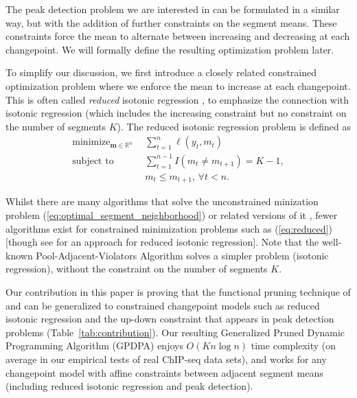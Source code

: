 \documentclass[twoside,11pt]{article}
\DeclareMathOperator*{\minimize}{minimize}
\newcommand{\RR}{\mathbb R}
\begin{document}
The peak detection problem we are interested in can be formulated in a similar way, but with
the addition of further constraints on the segment means. These constraints force the mean
to alternate between increasing and decreasing at each changepoint. We will formally define the resulting
optimization problem later.

To simplify our discussion, we first introduce a closely related
constrained optimization problem where we enforce the mean to increase
at each changepoint. This is often called \emph{reduced} isotonic regression
\citep{reduced-monotonic-regression}, to emphasize the connection with
isotonic regression (which includes the increasing
constraint but no constraint on the number of segments $K$). The
reduced isotonic regression problem is defined as
\begin{align}
  \label{eq:reduced}
  \minimize_{\mathbf m\in\RR^n} &\ \ 
  \sum_{t=1}^n \ell(y_t, m_t)\\
  \text{subject to} &\ \  \sum_{t=1}^{n-1} I(m_t \neq m_{t+1}) = K-1,
  \nonumber\\
  &\ \  m_t \leq m_{t+1},\, \forall t<n.
  \nonumber 
\end{align}

Whilst there are many algorithms that solve the unconstrained
minization problem (\ref{eq:optimal_segment_neighborhood})
\citep{segment-neighborhood,pruned-dp,phd-johnson} or related versions
of it \citep{optimal-partitioning,pelt,fpop,flsa}, fewer algorithms
exist for constrained minimization problems such as (\ref{eq:reduced})
[though see \citet{hardwick2014optimal} for an approach for reduced
isotonic regression]. Note that the well-known Pool-Adjacent-Violators
Algorithm \citep{mair2009isotone} solves a simpler problem (isotonic
regression), without the constraint on the number of segments $K$.

Our contribution in this paper is proving
that the functional pruning technique of \citet{pruned-dp} and
\citet{fpop} can be generalized to constrained changepoint models such
as reduced isotonic regression and the up-down constraint that appears
in peak detection problems (Table~\ref{tab:contribution}). Our
resulting Generalized Pruned Dynamic Programming Algorithm (GPDPA)
enjoys $O(Kn\log n)$ time complexity (on average in our empirical
tests of real ChIP-seq data sets), and works for any changepoint model
with affine constraints between adjacent segment means (including
reduced isotonic regression and peak detection).
\end{document}
